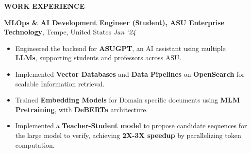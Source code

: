 \documentclass[10pt,a4]{article}
\def\hrulefill{\leavevmode\leaders\hrule height 1pt\hfill\kern0pt}		%
\begin{document}
{\begin{flushleft}

    

\end{flushleft}
		
		
		
\begin{flushleft}
    {\Large \textbf{WORK EXPERIENCE}} %

    \vspace{1.5mm}
    \textbf{\large MLOps \& AI Development Engineer (Student), ASU Enterprise Technology},   Tempe, United States \hfill \textit{\large Jan '24}	\\
    \begin{itemize}
        \item Engineered the backend for \textbf{ASUGPT}, an AI assistant using multiple \textbf{LLMs}, supporting students and professors across ASU.
        \item Implemented \textbf{Vector Databases} and \textbf{Data Pipelines} on \textbf{OpenSearch} for scalable Information retrieval.
        \item Trained \textbf{Embedding Models} for Domain specific documents using \textbf{MLM Pretraining}, with  \textbf{DeBERTa} architecture.
        \item Implemented a \textbf{Teacher-Student model} to propose candidate sequences for the large model to verify, achieving \textbf{2X-3X speedup} by parallelizing token computation.
    

\end{itemize}
\end{flushleft}}
\end{document}
